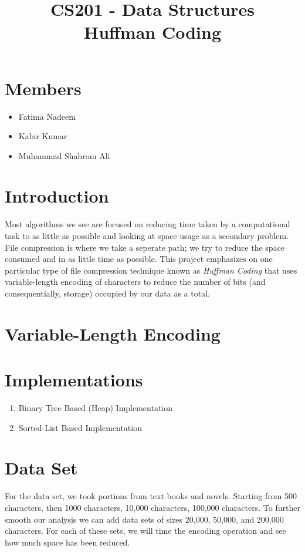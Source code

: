 \documentclass[a4paper, 12pt]{article}
\title{CS201 - Data Structures \\ Huffman Coding}
\author{}
\begin{document}
\setlength{\parskip}{10pt}
\setlength{\parindent}{0pt}
\maketitle

\newpage

\section{Members}
\begin{itemize}
	\item Fatima Nadeem
	\item Kabir Kumar
	\item Muhammad Shahrom Ali
\end{itemize}


\section{Introduction}
	Most algorithms we see are focused on reducing time taken by a computational task to as little as possible and looking at space usage as a secondary problem. 
	File compression is where we take a seperate path; we try to reduce the space consumed and in as little time as possible. 
	This project emphasizes on one particular type of file compression technique known as \textit{Huffman Coding} that uses variable-length encoding of characters to reduce the number of bits (and consequentially, storage) occupied by our data as a total. 

\section{Variable-Length Encoding}

\section{Implementations}

\begin{enumerate}
	\item Binary Tree Based (Heap) Implementation 
	
	\item Sorted-List Based Implementation 
\end{enumerate}


\section{Data Set}
	For the data set, we took portions from text books and novels. Starting from 500 characters, then 1000 characters, 10,000 characters, 100,000 characters. To further smooth our analysis we can add data sets of sizes 20,000, 50,000, and 200,000 characters. 
	For each of these sets, we will time the encoding operation and see how much space has been reduced. 
\end{document}

